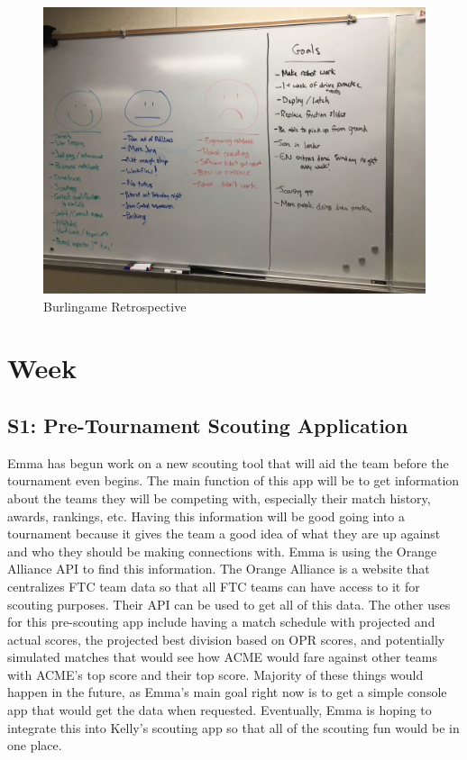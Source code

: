 \documentclass{article}
\begin{document}
\begin{figure}
    \centering
    \includegraphics[width=.6 \textwidth]{12_11-19/images/retrospective.JPG}
    \caption{Burlingame Retrospective}
    \label{fig:retrospective}
\end{figure}
\clearpage \newpage \section{Week \thesection} 
\subsection{S1: Pre-Tournament Scouting Application}

Emma has begun work on a new scouting tool that will aid the team before the tournament even begins. The main function of this app will be to get information about the teams they will be competing with, especially their match history, awards, rankings, etc. Having this information will be good going into a tournament because it gives the team a good idea of what they are up against and who they should be making connections with. Emma is using the Orange Alliance API to find this information. The Orange Alliance is a website that centralizes FTC team data so that all FTC teams can have access to it for scouting purposes. Their API can be used to get all of this data. The other uses for this pre-scouting app include having a match schedule with projected and actual scores, the projected best division based on OPR scores, and potentially simulated matches that would see how ACME would fare against other teams with ACME's top score and their top score. Majority of these things would happen in the future, as Emma's main goal right now is to get a simple console app that would get the data when requested. Eventually, Emma is hoping to integrate this into Kelly's scouting app so that all of the scouting fun would be in one place. 
\end{document}
